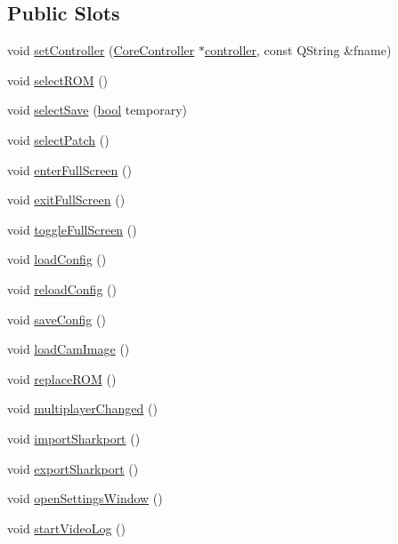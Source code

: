 \subsection*{Public Slots}
\begin{DoxyCompactItemize}
\item 
void \mbox{\hyperlink{class_q_g_b_a_1_1_window_abe01a1ebe877d333fb60c3f0fc621f0c}{set\+Controller}} (\mbox{\hyperlink{class_q_g_b_a_1_1_core_controller}{Core\+Controller}} $\ast$\mbox{\hyperlink{class_q_g_b_a_1_1_window_a708613d047d676e79ce9b0dbed95a891}{controller}}, const Q\+String \&fname)
\item 
void \mbox{\hyperlink{class_q_g_b_a_1_1_window_a11460c0780140a4c0ebac4d51b4f1a5d}{select\+R\+OM}} ()
\item 
void \mbox{\hyperlink{class_q_g_b_a_1_1_window_a5b8372017cd7411b77a865eca2078b75}{select\+Save}} (\mbox{\hyperlink{libretro_8h_a4a26dcae73fb7e1528214a068aca317e}{bool}} temporary)
\item 
void \mbox{\hyperlink{class_q_g_b_a_1_1_window_a46e83ed0f628884840257d9534a6fa29}{select\+Patch}} ()
\item 
void \mbox{\hyperlink{class_q_g_b_a_1_1_window_a92ffce5aac01967b0faaa5eb0885726e}{enter\+Full\+Screen}} ()
\item 
void \mbox{\hyperlink{class_q_g_b_a_1_1_window_a28d5345bc6bf0752ee64653885d08202}{exit\+Full\+Screen}} ()
\item 
void \mbox{\hyperlink{class_q_g_b_a_1_1_window_a4528810005bb005d12e41f0801e8b373}{toggle\+Full\+Screen}} ()
\item 
void \mbox{\hyperlink{class_q_g_b_a_1_1_window_aef5de858c5948796e6e46699c1d2f45e}{load\+Config}} ()
\item 
void \mbox{\hyperlink{class_q_g_b_a_1_1_window_aad41987baa475389a724b96d53183db2}{reload\+Config}} ()
\item 
void \mbox{\hyperlink{class_q_g_b_a_1_1_window_a9d31b6bc2ec42e500c9fa6370ec89f52}{save\+Config}} ()
\item 
void \mbox{\hyperlink{class_q_g_b_a_1_1_window_a44460af2464844d12066bd0ad2e6c955}{load\+Cam\+Image}} ()
\item 
void \mbox{\hyperlink{class_q_g_b_a_1_1_window_a6a7f2bc2a0c283d8de4304e383e5eac6}{replace\+R\+OM}} ()
\item 
void \mbox{\hyperlink{class_q_g_b_a_1_1_window_a26248c798c9d9d49932b7ae417598bea}{multiplayer\+Changed}} ()
\item 
void \mbox{\hyperlink{class_q_g_b_a_1_1_window_a6b323a99433d192ca86d725b8336bfda}{import\+Sharkport}} ()
\item 
void \mbox{\hyperlink{class_q_g_b_a_1_1_window_a22981b021419ff73e53ec7e1cbf661b9}{export\+Sharkport}} ()
\item 
void \mbox{\hyperlink{class_q_g_b_a_1_1_window_acf3797e7d048f6e0bda1e3a576b106f2}{open\+Settings\+Window}} ()
\item 
void \mbox{\hyperlink{class_q_g_b_a_1_1_window_a5cb56389e381fc24d6243cbd0a628aa1}{start\+Video\+Log}} ()
\end{DoxyCompactItemize}
